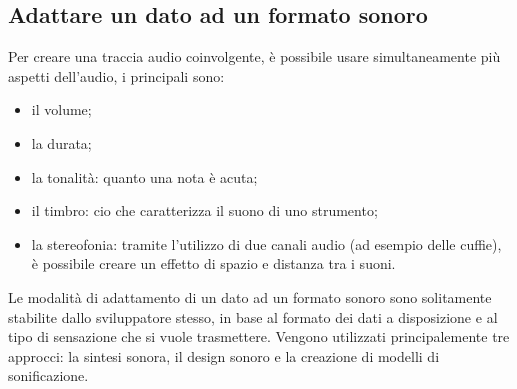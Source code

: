 \subsection{Adattare un dato ad un formato sonoro}
Per creare una traccia audio coinvolgente, è possibile usare simultaneamente più aspetti dell'audio, i principali sono:
\begin{itemize}
  \item{il volume;}
  \item{la durata;}
  \item{la tonalità: quanto una nota è acuta;}
  \item{il timbro: cio che caratterizza il suono di uno strumento;}
  \item{la stereofonia: tramite l'utilizzo di due canali audio (ad esempio delle cuffie), è possibile creare un effetto di spazio e distanza tra i suoni.}
\end{itemize}
Le modalità di adattamento di un dato ad un formato sonoro sono solitamente stabilite dallo sviluppatore stesso, in base al formato dei dati a disposizione e al tipo di sensazione che si vuole trasmettere.
Vengono utilizzati principalemente tre approcci: la sintesi sonora, il design sonoro e la creazione di modelli di sonificazione.
